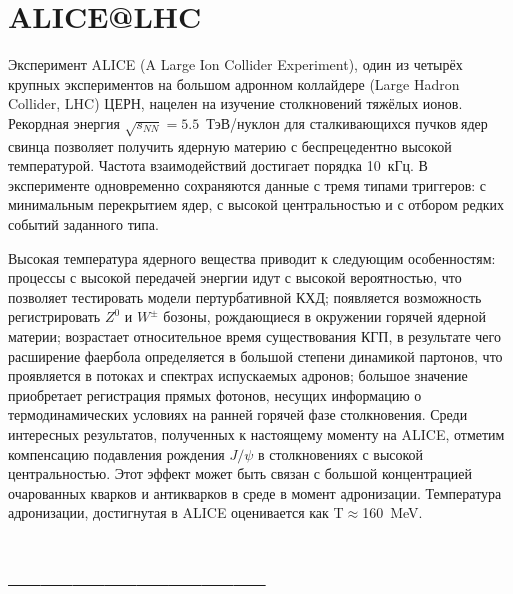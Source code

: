 
\section{ALICE@LHC}

Эксперимент ALICE (A Large Ion Collider Experiment), один из четырёх крупных экспериментов на большом адронном коллайдере (Large Hadron Collider, LHC) ЦЕРН, нацелен на изучение столкновений тяжёлых ионов. Рекордная энергия $\sqrt{s_{NN}}=5.5$~\mbox{ТэВ/нуклон} для сталкивающихся пучков ядер свинца позволяет получить ядерную материю с беспрецедентно высокой температурой. Частота взаимодействий достигает порядка 10~кГц. В эксперименте одновременно сохраняются данные с тремя типами триггеров: с минимальным перекрытием ядер, с высокой центральностью и с отбором редких событий заданного типа.

Высокая температура ядерного вещества приводит к следующим особенностям: процессы с высокой передачей энергии идут с высокой вероятностью, что позволяет тестировать модели пертурбативной КХД; появляется возможность регистрировать $Z^{0}$ и $W^{\pm}$ бозоны, рождающиеся в окружении горячей ядерной материи; возрастает относительное время существования КГП, в результате чего расширение фаербола определяется в большой степени динамикой партонов, что проявляется в потоках и спектрах испускаемых адронов; большое значение приобретает регистрация прямых фотонов, несущих информацию о термодинамических условиях на ранней горячей фазе столкновения. Среди интересных результатов, полученных к настоящему моменту на ALICE, отметим компенсацию подавления рождения $J/\psi$ в столкновениях с высокой центральностью. Этот эффект может быть связан с большой концентрацией очарованных кварков и антикварков в среде в момент адронизации. Температура адронизации, достигнутая в ALICE оценивается как T$\approx$160~MeV.

%


\section{------------------------}

